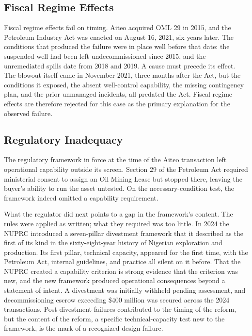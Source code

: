 \documentclass[twoside,fontset=lmodern]{mitthesis}
\begin{document}
\hypertarget{fiscal-regime-effects}{%
\subsection{Fiscal Regime Effects}\label{fiscal-regime-effects}}

Fiscal regime effects fail on timing. Aiteo acquired OML 29 in 2015, and
the Petroleum Industry Act was enacted on August 16, 2021, six years
later. The conditions that produced the failure were in place well
before that date: the suspended well had been left undecommissioned
since 2015, and the unremediated spills date from 2018 and 2019. A cause
must precede its effect. The blowout itself came in November 2021, three
months after the Act, but the conditions it exposed, the absent
well-control capability, the missing contingency plan, and the prior
unmanaged incidents, all predated the Act. Fiscal regime effects are
therefore rejected for this case as the primary explanation for the
observed failure.

\hypertarget{regulatory-inadequacy}{%
\subsection{Regulatory Inadequacy}\label{regulatory-inadequacy}}

The regulatory framework in force at the time of the Aiteo transaction
left operational capability outside its screen. Section 29 of the
Petroleum Act required ministerial consent to assign an Oil Mining Lease
but stopped there, leaving the buyer's ability to run the asset
untested. On the necessary-condition test, the framework indeed omitted
a capability requirement.

What the regulator did next points to a gap in the framework's content.
The rules were applied as written; what they required was too little. In
2024 the NUPRC introduced a seven-pillar divestment framework that it
described as the first of its kind in the sixty-eight-year history of
Nigerian exploration and production. Its first pillar, technical
capacity, appeared for the first time, with the Petroleum Act, internal
guidelines, and practice all silent on it before. That the NUPRC created
a capability criterion is strong evidence that the criterion was new,
and the new framework produced operational consequences beyond a
statement of intent. A divestment was initially withheld pending
assessment, and decommissioning escrow exceeding \$400 million was
secured across the 2024 transactions. Post-divestment failures
contributed to the timing of the reform, but the content of the reform,
a specific technical-capacity test new to the framework, is the mark of
a recognized design failure.
\end{document}
